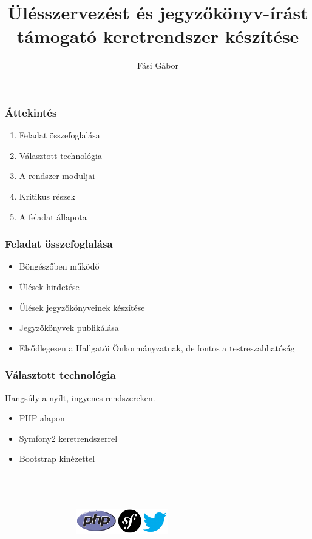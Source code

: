 \documentclass[12pt]{beamer}
\title[Ülésszervezést és jk.-írást támogató kr. készítése\hspace{4em}\insertframenumber/\inserttotalframenumber]{Ülésszervezést és jegyzőkönyv-írást támogató keretrendszer készítése}
\author{Fási Gábor}
\institute{Konzulens: Dulai Tibor}
\date{}
\begin{document}
\frame{\titlepage}

\begin{frame}
    \frametitle{Áttekintés}
    \Large
    \begin{enumerate}
        \item Feladat összefoglalása
        \item Választott technológia
        \item A rendszer moduljai
        \item Kritikus részek
        \item A feladat állapota
    \end{enumerate}
\end{frame}

\begin{frame}
    \frametitle{Feladat összefoglalása}
    
    \Large
    \begin{itemize}
	    \item Böngészőben működő
	    \item Ülések hirdetése
	    \item Ülések jegyzőkönyveinek készítése
	    \item Jegyzőkönyvek publikálása
	    \item Elsődlegesen a Hallgatói Önkormányzatnak, de fontos a testreszabhatóság
    \end{itemize}
\end{frame}

\begin{frame}
    \frametitle{Választott technológia}

    \Large
    Hangsúly a nyílt, ingyenes rendszereken.
    
    \begin{itemize}
        \item PHP alapon
        \item Symfony2 keretrendszerrel
        \item Bootstrap kinézettel
    \end{itemize}
~\\~\\~\\~
    ~~~~~~~~~~~~~~~\includegraphics[center,width=0.3\textwidth,center]{logok.png}
\end{frame}
\end{document}
